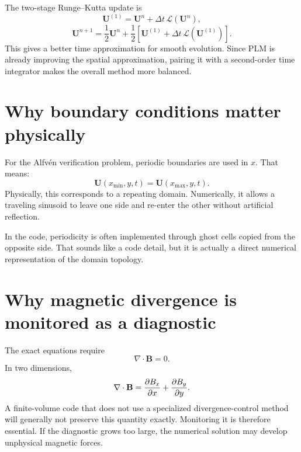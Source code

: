 \documentclass[11pt]{article}
\newcommand{\Uvec}{\mathbf{U}}
\newcommand{\Bvec}{\mathbf{B}}
\begin{document}
The two-stage Runge--Kutta update is
\begin{equation}
\Uvec^{(1)}=\Uvec^n+\Delta t\,\mathcal{L}(\Uvec^n),
\end{equation}
\begin{equation}
\Uvec^{n+1}
=
\frac12\Uvec^n
+
\frac12\left[
\Uvec^{(1)}+\Delta t\,\mathcal{L}(\Uvec^{(1)})
\right].
\label{eq:m4-rk2}
\end{equation}
This gives a better time approximation for smooth evolution. Since PLM is already improving the spatial approximation, pairing it with a second-order time integrator makes the overall method more balanced.

\section{Why boundary conditions matter physically}
For the Alfv\'en verification problem, periodic boundaries are used in $x$. That means:
\begin{equation}
\Uvec(x_{\min},y,t)=\Uvec(x_{\max},y,t).
\end{equation}
Physically, this corresponds to a repeating domain. Numerically, it allows a traveling sinusoid to leave one side and re-enter the other without artificial reflection.

In the code, periodicity is often implemented through ghost cells copied from the opposite side. That sounds like a code detail, but it is actually a direct numerical representation of the domain topology.

\section{Why magnetic divergence is monitored as a diagnostic}
The exact equations require
\begin{equation}
\nabla\cdot\Bvec=0.
\label{eq:m4-divb}
\end{equation}
In two dimensions,
\begin{equation}
\nabla\cdot\Bvec
=
\pdv{B_x}{x}+\pdv{B_y}{y}.
\end{equation}
A finite-volume code that does not use a specialized divergence-control method will generally not preserve this quantity exactly. Monitoring it is therefore essential. If the diagnostic grows too large, the numerical solution may develop unphysical magnetic forces.
\end{document}
